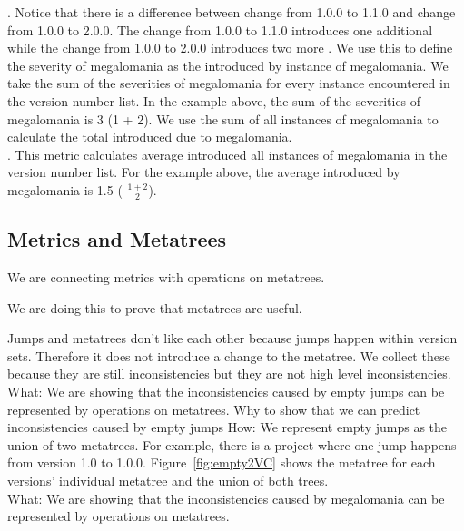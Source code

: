 \documentclass[conference]{IEEEtran}
\begin{document}
.  
Notice that there is a difference between change from 1.0.0 to 1.1.0 and change from 1.0.0 to 2.0.0. 
The change from 1.0.0 to 1.1.0 introduces one additional \choice while the change from 1.0.0 to 2.0.0 introduces two more \choices.
We use this to define the severity of megalomania as the \numberextrachoices introduced by instance of megalomania.
 We take the sum of the severities of megalomania for every instance encountered in  the version number list.
In the example above, the sum of the severities of megalomania is 3 (1 + 2).
We use the sum of all instances of megalomania to calculate the total \numberchoices introduced due to megalomania. \\

 
. 
This metric calculates average \numberchoices introduced all instances of megalomania in the version number list. For the example above, the average \numberchoices introduced by megalomania is 1.5 ( $\frac{ 1 + 2}{2}$).
 \\


\subsection{Metrics and Metatrees}

We are connecting metrics with operations on metatrees.

We are doing this to prove that metatrees are useful.

Jumps and metatrees don't like each other because jumps happen within version sets. 
Therefore it does not introduce a change to the metatree.
We collect these because they are still inconsistencies but they are not high level inconsistencies. \\

What: We are showing that the inconsistencies caused by empty jumps can be represented by operations on metatrees.
Why to show that we can predict inconsistencies caused by empty jumps
How: We represent empty jumps as the union of two metatrees. 
For example, there is a project where one jump happens from version 1.0 to 1.0.0. 
Figure~\ref{fig:empty2VC} shows the metatree for each versions' individual metatree and the union of both trees. \\

What:  We are showing that the inconsistencies caused by megalomania can be represented by operations on metatrees.
\end{document}
